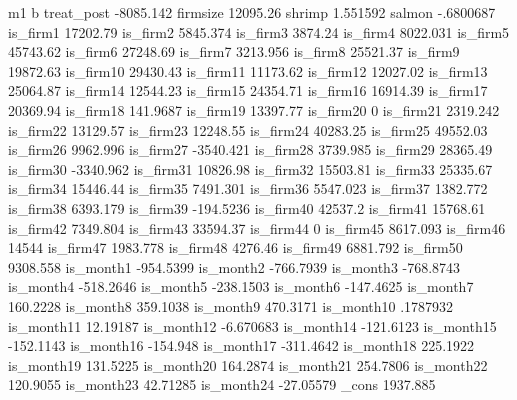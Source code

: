 	m1
	b
treat_post	-8085.142
firmsize	12095.26
shrimp	1.551592
salmon	-.6800687
is_firm1	17202.79
is_firm2	5845.374
is_firm3	3874.24
is_firm4	8022.031
is_firm5	45743.62
is_firm6	27248.69
is_firm7	3213.956
is_firm8	25521.37
is_firm9	19872.63
is_firm10	29430.43
is_firm11	11173.62
is_firm12	12027.02
is_firm13	25064.87
is_firm14	12544.23
is_firm15	24354.71
is_firm16	16914.39
is_firm17	20369.94
is_firm18	141.9687
is_firm19	13397.77
is_firm20	0
is_firm21	2319.242
is_firm22	13129.57
is_firm23	12248.55
is_firm24	40283.25
is_firm25	49552.03
is_firm26	9962.996
is_firm27	-3540.421
is_firm28	3739.985
is_firm29	28365.49
is_firm30	-3340.962
is_firm31	10826.98
is_firm32	15503.81
is_firm33	25335.67
is_firm34	15446.44
is_firm35	7491.301
is_firm36	5547.023
is_firm37	1382.772
is_firm38	6393.179
is_firm39	-194.5236
is_firm40	42537.2
is_firm41	15768.61
is_firm42	7349.804
is_firm43	33594.37
is_firm44	0
is_firm45	8617.093
is_firm46	14544
is_firm47	1983.778
is_firm48	4276.46
is_firm49	6881.792
is_firm50	9308.558
is_month1	-954.5399
is_month2	-766.7939
is_month3	-768.8743
is_month4	-518.2646
is_month5	-238.1503
is_month6	-147.4625
is_month7	160.2228
is_month8	359.1038
is_month9	470.3171
is_month10	.1787932
is_month11	12.19187
is_month12	-6.670683
is_month14	-121.6123
is_month15	-152.1143
is_month16	-154.948
is_month17	-311.4642
is_month18	225.1922
is_month19	131.5225
is_month20	164.2874
is_month21	254.7806
is_month22	120.9055
is_month23	42.71285
is_month24	-27.05579
_cons	1937.885
